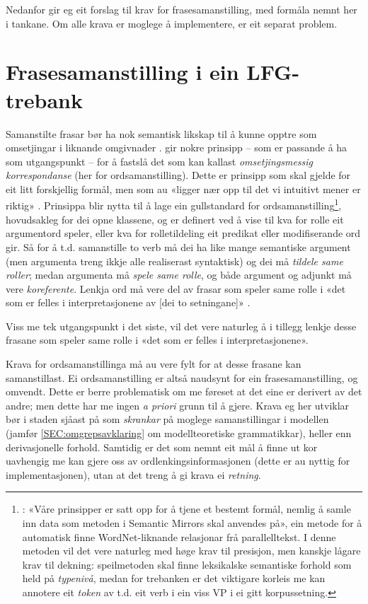 \documentclass[12pt,a4paper,oneside,draft]{report}
\begin{document}
Nedanfor gir eg eit forslag til krav for frasesamanstilling, med
 formåla nemnt her i tankane. Om alle krava er moglege å implementere,
 er eit separat problem.

\section{Frasesamanstilling i ein LFG-trebank}
\label{sec-3.3}


Samanstilte frasar bør ha nok semantisk likskap til å kunne opptre som
omsetjingar i liknande omgivnader
\citep[s.~74]{dyvik2009lmp}. \citet{thunes2003eal} gir nokre prinsipp
-- som er passande å ha som utgangspunkt -- for å fastslå det som kan
kallast \emph{omsetjingsmessig korrespondanse} (her for
ordsamanstilling). Dette er prinsipp som skal gjelde for eit litt
forskjellig formål, men som au «ligger nær opp til det vi intuitivt
mener er riktig» \citep[s.~2]{thunes2003eal}. Prinsippa blir nytta til
å lage ein gullstandard for ordsamanstilling\footnote{\cite[s.~2]{thunes2003eal}: «Våre prinsipper er satt
       opp for å tjene et bestemt formål, nemlig å samle inn data som
       metoden i Semantic Mirrors skal anvendes på», ein metode for å
       automatisk finne WordNet-liknande relasjonar frå
       parallelltekst. I denne metoden vil det vere naturleg med høge
       krav til presisjon, men kanskje lågare krav til dekning:
       speilmetoden skal finne leksikalske semantiske forhold som held
       på \emph{typenivå}, medan for trebanken er det viktigare korleis me
       kan annotere eit \emph{token} av t.d. eit verb i ein viss VP i ei
       gitt korpussetning. },
hovudsakleg for dei opne klassene, og er definert ved å vise til kva
for rolle eit argumentord speler, eller kva for rolletildeling eit
predikat eller modifiserande ord gir. Så for å t.d. samanstille to
verb må dei ha like mange semantiske argument (men argumenta treng
ikkje alle realiserast syntaktisk) og dei må \emph{tildele same roller};
medan argumenta må \emph{spele same rolle}, og både argument og adjunkt må
vere \emph{koreferente}. Lenkja ord må vere del av frasar som speler same
rolle i «det som er felles i interpretasjonene av [dei to setningane]»
\citep[s.~3]{thunes2003eal}.


Viss me tek utgangspunkt i det siste, vil det vere naturleg å i
tillegg lenkje desse frasane som speler same rolle i «det som er
felles i interpretasjonene».

Krava for ordsamanstillinga må au vere fylt for at desse frasane kan
samanstillast. Ei ordsamanstilling er altså naudsynt for ein
frasesamanstilling, og omvendt. Dette er berre problematisk om me
føreset at det eine er derivert av det andre; men dette har me ingen
\emph{a priori} grunn til å gjere. Krava eg her utviklar bør i staden
sjåast på som \emph{skrankar} på moglege samanstillingar i modellen (jamfør
\ref{SEC:omgrepsavklaring} om modellteoretiske grammatikkar), heller
enn derivasjonelle forhold. Samtidig er det som nemnt eit mål å finne
ut kor uavhengig me kan gjere oss av ordlenkingsinformasjonen (dette
er au nyttig for implementasjonen), utan at det treng å gi krava ei
\emph{retning}.
\end{document}
